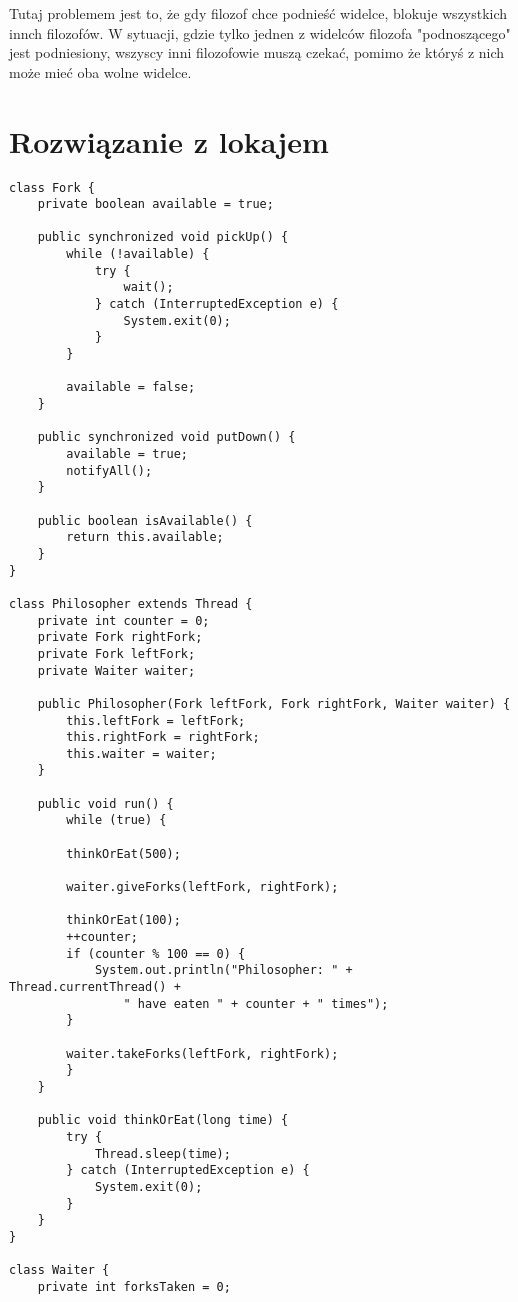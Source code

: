 \documentclass{article}
\begin{document}
Tutaj problemem jest to, że gdy filozof chce podnieść widelce, blokuje wszystkich innch filozofów.
W sytuacji, gdzie tylko jednen z widelców filozofa "podnoszącego" jest podniesiony, 
wszyscy inni filozofowie muszą czekać, pomimo że któryś z nich może mieć oba wolne widelce.

\section{Rozwiązanie z lokajem}

\begin{verbatim}
class Fork {
    private boolean available = true;

    public synchronized void pickUp() {
        while (!available) {
            try {
                wait();
            } catch (InterruptedException e) {
                System.exit(0);
            }
        }
        
        available = false;
    }
    
    public synchronized void putDown() {
        available = true;
        notifyAll();
    }

    public boolean isAvailable() {
        return this.available;
    }
}
    
class Philosopher extends Thread {
    private int counter = 0;
    private Fork rightFork;
    private Fork leftFork;
    private Waiter waiter;

    public Philosopher(Fork leftFork, Fork rightFork, Waiter waiter) {
        this.leftFork = leftFork;
        this.rightFork = rightFork;
        this.waiter = waiter;
    }
    
    public void run() {
        while (true) {

        thinkOrEat(500);
    
        waiter.giveForks(leftFork, rightFork);

        thinkOrEat(100);
        ++counter;
        if (counter % 100 == 0) {
            System.out.println("Philosopher: " + Thread.currentThread() + 
                " have eaten " + counter + " times");
        }

        waiter.takeForks(leftFork, rightFork);
        }
    }

    public void thinkOrEat(long time) {
        try {
            Thread.sleep(time);
        } catch (InterruptedException e) {
            System.exit(0);
        }
    }
}

class Waiter {
    private int forksTaken = 0;


\end{verbatim}
\end{document}
